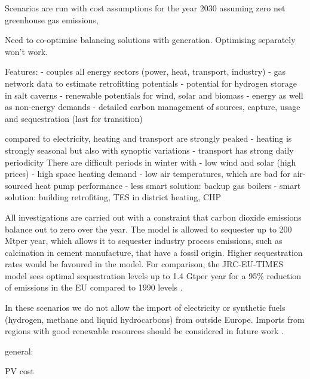 Scenarios are run with cost
assumptions for the year 2030 assuming zero net greenhouse gas emissions,

Need to co-optimise balancing solutions with generation. Optimising separately won't work.


Features:
- couples all energy sectors (power, heat, transport, industry)
- gas network data to estimate retrofitting potentials
- potential for hydrogen storage in salt caverns
- renewable potentials for wind, solar and biomass
- energy as well as non-energy demands
- detailed carbon management of sources, capture, usage and sequestration (last for transition)


compared to electricity, heating and transport are strongly peaked
- heating is strongly seasonal but also with synoptic variations
- transport has strong daily periodicity
There are difficult periods in winter with
- low wind and solar (high prices)
- high space heating demand
- low air temperatures, which are bad for air-sourced heat pump performance
- less smart solution: backup gas boilers
- smart solution: building retrofiting, TES in district heating, CHP


All investigations are carried out with a constraint that carbon dioxide
emissions balance out to zero over the year. The model is allowed to sequester
up to 200 Mt\co per year, which allows it to sequester industry process
emissions, such as calcination in cement manufacture, that have a fossil origin.
Higher sequestration rates would be favoured in the model. For comparison, the
JRC-EU-TIMES model sees optimal sequestration levels up to 1.4 Gt\co per year
for a 95\% reduction of \co emissions in the EU compared to 1990 levels
\cite{blancoPotentialHydrogen2018}.

In these scenarios we do not allow the import of electricity or synthetic fuels
(hydrogen, methane and liquid hydrocarbons) from outside Europe. Imports from
regions with good renewable resources should be considered in future work
\cite{fasihiTechnoeconomicAssessment2019,heuserTechnoeconomicAnalysis2019}.

general:
\cite{
    mckennaScenicnessAssessment2021,
    krummModellingSocial2022,
    weinandImpactPublic2021,
    weinandExploringTrilemma,
    trondleTradeOffsGeographic2020,
    sasseDistributionalTradeoffs2019,
    sasseRegionalImpacts2020,
    ludererImpactDeclining2021,
    EuropeanHydrogen,
    victoria2020,
    victoriaSpeedTechnological2021,
    lombardiPolicyDecision2020,
    tsiropoulosNetzeroEmissions2020,
    europeancommission.directorategeneralforenergy.METISStudy2021,
    deutschNoRegretHydrogen,
    tafarteQuantifyingTrade,
    lehmannManagingSpatial}

PV cost
\cite{
    jaxa-rozenSourcesUncertainty2021,
    victoriaSolarPhotovoltaics2021,
    xiaoPlummetingCosts2021}